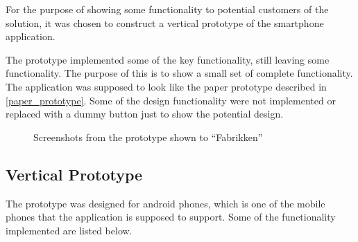 For the purpose of showing some functionality to potential customers of the solution, it was chosen to construct a vertical prototype of the smartphone application.

The prototype implemented some of the key functionality, still leaving some functionality. The purpose of this is to show a small set of complete functionality. The application was supposed to look like the paper prototype described in \cref{paper_prototype}. Some of the design functionality were not implemented or replaced with a dummy button just to show the potential design.

\begin{figure}[hbtp]
  \centering
  \caption{Screenshots from the prototype shown to \enquote{Fabrikken}}
\end{figure}

\subsection{Vertical Prototype}
\label{sub:vertical_prototype}
The prototype was designed for android phones, which is one of the mobile phones that the application is supposed to support. Some of the functionality implemented are listed below.

